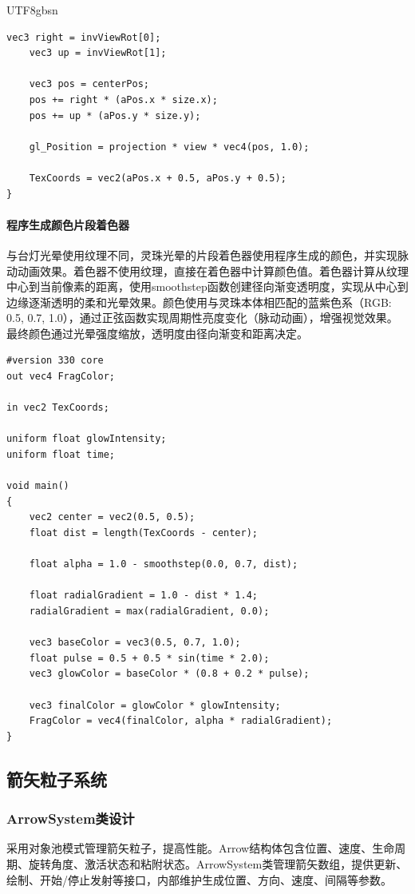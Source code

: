 \documentclass{article}
\begin{document}
\begin{CJK}{UTF8}{gbsn}
\begin{lstlisting}[caption=灵珠光晕顶点着色器]
    vec3 right = invViewRot[0];
    vec3 up = invViewRot[1];
    
    vec3 pos = centerPos;
    pos += right * (aPos.x * size.x);
    pos += up * (aPos.y * size.y);
    
    gl_Position = projection * view * vec4(pos, 1.0);
    
    TexCoords = vec2(aPos.x + 0.5, aPos.y + 0.5);
}
\end{lstlisting}

\paragraph{程序生成颜色片段着色器}
与台灯光晕使用纹理不同，灵珠光晕的片段着色器使用程序生成的颜色，并实现脉动动画效果。着色器不使用纹理，直接在着色器中计算颜色值。着色器计算从纹理中心到当前像素的距离，使用smoothstep函数创建径向渐变透明度，实现从中心到边缘逐渐透明的柔和光晕效果。颜色使用与灵珠本体相匹配的蓝紫色系（RGB: 0.5, 0.7, 1.0），通过正弦函数实现周期性亮度变化（脉动动画），增强视觉效果。最终颜色通过光晕强度缩放，透明度由径向渐变和距离决定。

\begin{lstlisting}[caption=灵珠光晕片段着色器]
#version 330 core
out vec4 FragColor;

in vec2 TexCoords;

uniform float glowIntensity;
uniform float time;

void main()
{
    vec2 center = vec2(0.5, 0.5);
    float dist = length(TexCoords - center);
    
    float alpha = 1.0 - smoothstep(0.0, 0.7, dist);
    
    float radialGradient = 1.0 - dist * 1.4;
    radialGradient = max(radialGradient, 0.0);
    
    vec3 baseColor = vec3(0.5, 0.7, 1.0);
    float pulse = 0.5 + 0.5 * sin(time * 2.0);
    vec3 glowColor = baseColor * (0.8 + 0.2 * pulse);
    
    vec3 finalColor = glowColor * glowIntensity;
    FragColor = vec4(finalColor, alpha * radialGradient);
}
\end{lstlisting}

\subsection{箭矢粒子系统}

\subsubsection{ArrowSystem类设计}
采用对象池模式管理箭矢粒子，提高性能。Arrow结构体包含位置、速度、生命周期、旋转角度、激活状态和粘附状态。ArrowSystem类管理箭矢数组，提供更新、绘制、开始/停止发射等接口，内部维护生成位置、方向、速度、间隔等参数。


\end{CJK}
\end{document}
